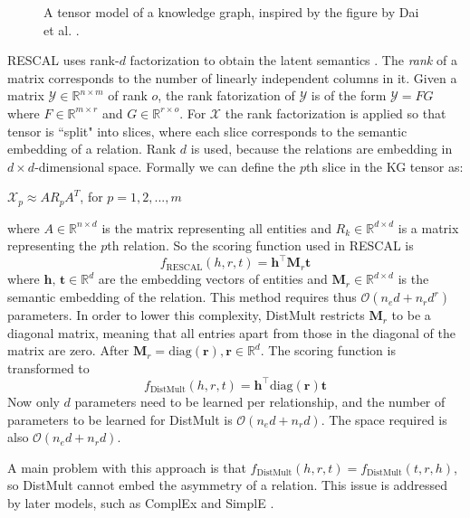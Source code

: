 \begin{figure}[htp]
    \centering
    
    \caption[A tensor model of a knowledge graph.]{A tensor model of a knowledge graph, inspired by the figure by Dai et al. \cite{dai2020survey}.}
    \label{tensor_model_fig}
\end{figure}

RESCAL uses rank-$d$ factorization to obtain the latent semantics \cite{RESCAL}. The \textit{rank} of a matrix corresponds to the number of linearly independent columns in it. Given a matrix $\mathcal{Y} \in \mathbb{R}^{n\times m}$ of rank $o$, the rank fatorization of $\mathcal{Y}$ is of the form $\mathcal{Y}=FG$ where $F\in \mathbb{R}^{m\times r}$ and $G\in \mathbb{R}^{r\times o}$. For $\mathcal{X}$ the rank factorization is applied so that tensor is ``split" into slices, where each slice corresponds to the semantic embedding of a relation. Rank $d$ is used, because the relations are embedding in $d \times d$-dimensional space. Formally we can define the $p$th slice in the KG tensor as:
\begin{center}
 $\mathcal{X}_p \approx AR_p A^T$, for $p = 1,2,...,m$
\end{center}
where $A\in \mathbb{R}^{n\times d}$ is the matrix representing all entities and $R_k\in \mathbb{R}^{d\times d}$ is a matrix representing the $p$th relation.
So the scoring function used in RESCAL is
\[f_ {\text{RESCAL}}(h, r, t) =\textbf{h}^{\top}\textbf{M}_r\textbf{t}\]
where $\textbf{h, t}\in \mathbb{R}^{d}$ are the embedding vectors of entities and $\textbf{M}_r \in \mathbb{R}^{d\times d}$ is the semantic embedding of the relation.
This method requires thus $\mathcal{O}(n_ed + n_r d^r)$ parameters. In order to lower this complexity, DistMult restricts $\textbf{M}_r$ to be a diagonal matrix, meaning that all entries apart from those in the diagonal of the matrix are zero. After $\textbf{M}_r = \text{diag}(\textbf{r}), \textbf{r}\in\mathbb{R}^d$. The scoring function is transformed to
\[f_ {\text{DistMult}}(h, r, t) =\textbf{h}^{\top}\text{diag}(\textbf{r})\textbf{t}\]
Now only $d$ parameters need to be learned per relationship, and the number of parameters to be learned for DistMult is $\mathcal{O}(n_ed + n_r d)$. The space required is also $\mathcal{O}(n_ed + n_r d)$.

A main problem with this approach is that $f_ {\text{DistMult}}(h, r, t) = f_ {\text{DistMult}}(t, r, h)$, so DistMult cannot embed the asymmetry of a relation. This issue is addressed by later models, such as ComplEx \cite{complEx} and SimplE \cite{SimplE}.


